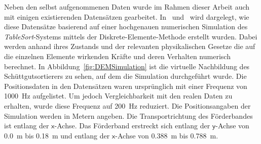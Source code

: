 
Neben den selbst aufgenommenen Daten wurde im Rahmen dieser Arbeit auch mit einigen existierenden Datensätzen gearbeitet.
In \cite{pieper2016numerical}~und~\cite{pieper2017numerical} wird dargelegt, wie diese Datensätze basierend auf einer hochgenauen numerischen Simulation des \textit{TableSort}-Systems mittels der Diskrete-Elemente-Methode erstellt wurden.
Dabei werden anhand ihres Zustands und der relevanten physikalischen Gesetze die auf die einzelnen Elemente wirkenden Kräfte und deren Verhalten numerisch berechnet. 
In Abbildung~\ref{fig:DEMSimulation} ist die virtuelle Nachbildung des Schüttgutsortierers zu sehen, auf dem die Simulation durchgeführt wurde.
Die Positionsdaten in den Datensätzen waren ursprünglich mit einer Frequenz von \SI{1000}{\hertz} aufgelistet.
Um jedoch Vergleichbarkeit mit den realen Daten zu erhalten, wurde diese Frequenz auf \SI{200}{\hertz} reduziert.
Die Positionsangaben der Simulation werden in Metern angeben.
Die Transportrichtung des Förderbandes ist entlang der \(\mathsf{x}\)-Achse.
Das Förderband erstreckt sich entlang der \(\mathsf{y}\)-Achse von \SI{0.0}{\meter} bis \SI{0.18}{\meter} und entlang der \(\mathsf{x}\)-Achse von \SI{0.388}{\meter} bis \SI{0.788}{\meter}.



